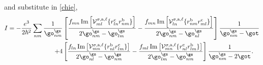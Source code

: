 and substitute in \eqref{chie},
\begin{align*}
I = -\frac{e^3}{2\hbar^2}\sum_{nm}\frac{1}{\go^\gs_{nm}}
&\left[
  \frac{f_{mn}\,\mathrm{Im}\left[\mathcal{V}^{\sigma,\text{a},\ell}_{ml}
        \{r^{\text{c}}_{ln}
        r^{\text{b}}_{nm}\}\right]}
        {2\go^\gs_{nm}-\go^\gs_{lm}}
 -\frac{f_{mn}\,\mathrm{Im}\left[\mathcal{V}^{\sigma,\text{a},\ell}_{ln}
        \{r^{\text{b}}_{nm}
        r^{\text{c}}_{ml}\}\right]}
        {2\go^\gs_{nm}-\go^\gs_{nl}}
\right]\frac{1}{\go^\gs_{nm}-\got}\nonumber\\
+
4&\left[
  \frac{f_{ln}\,\mathrm{Im}\left[\mathcal{V}^{\sigma,\text{a},\ell}_{mn}
        \{r^{\text{b}}_{nl}
        r^{\text{c}}_{lm}\}\right]}
        {2\go^\gs_{nl}-\go^\gs_{nm}}
 -\frac{f_{ml}\,\mathrm{Im}\left[\mathcal{V}^{\sigma,\text{a},\ell}_{mn}
        \{r^{\text{c}}_{nl}
        r^{\text{b}}_{lm}\}\right]}
        {2\go^\gs_{lm}-\go^\gs_{nm}}
\right]\frac{1}{\go^\gs_{nm}-2\got}
.
\end{align*}

